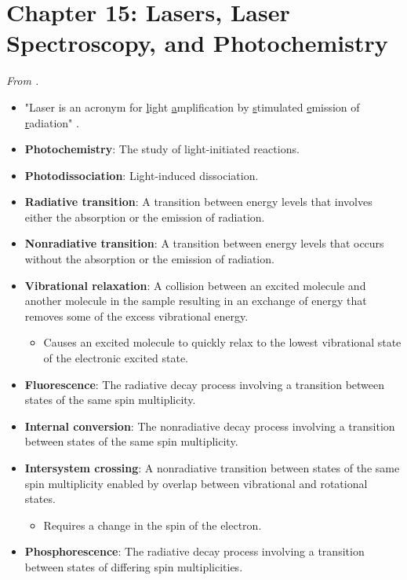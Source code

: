 \documentclass[../notes.tex]{subfiles}
\begin{document}
\section{Chapter 15: Lasers, Laser Spectroscopy, and Photochemistry}
\emph{From \textcite{bib:McQuarrieSimon}.}
\begin{itemize}
    \item {}"Laser is an acronym for \underline{l}ight \underline{a}mplification by \underline{s}timulated \underline{e}mission of \underline{r}adiation" \parencite[591]{bib:McQuarrieSimon}.
    \item \textbf{Photochemistry}: The study of light-initiated reactions.
    \item \textbf{Photodissociation}: Light-induced dissociation.
    \item \textbf{Radiative transition}: A transition between energy levels that involves either the absorption or the emission of radiation.
    \item \textbf{Nonradiative transition}: A transition between energy levels that occurs without the absorption or the emission of radiation.
    \item \textbf{Vibrational relaxation}: A collision between an excited molecule and another molecule in the sample resulting in an exchange of energy that removes some of the excess vibrational energy.
    \begin{itemize}
        \item Causes an excited molecule to quickly relax to the lowest vibrational state of the electronic excited state.
    \end{itemize}
    \item \textbf{Fluorescence}: The radiative decay process involving a transition between states of the same spin multiplicity.
    \item \textbf{Internal conversion}: The nonradiative decay process involving a transition between states of the same spin multiplicity.
    \item \textbf{Intersystem crossing}: A nonradiative transition between states of the same spin multiplicity enabled by overlap between vibrational and rotational states.
    \begin{itemize}
        \item Requires a change in the spin of the electron.
    \end{itemize}
    \item \textbf{Phosphorescence}: The radiative decay process involving a transition between states of differing spin multiplicities.

\end{itemize}
\end{document}
